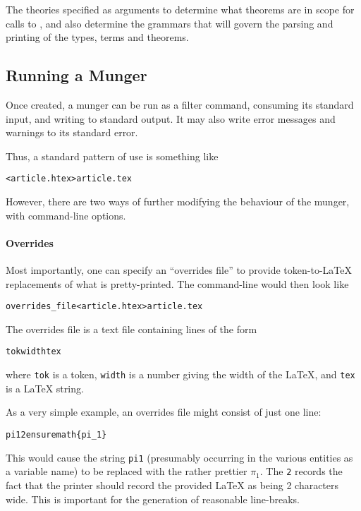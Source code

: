 The theories specified as arguments to \mkmunge{} determine what theorems are in scope for calls to \holthm, and also determine the grammars that will govern the parsing and printing of the \HOL{} types, terms and theorems.


\subsection{Running a Munger}
\label{sec:running-munger}

Once created, a munger can be run as a filter command, consuming its
standard input, and writing to standard output.
%
It may also write error messages and warnings to its standard error.

Thus, a standard pattern of use is something like
\begin{alltt}
   \munge < article.htex > article.tex
\end{alltt}

However, there are two ways of further modifying the behaviour of the
munger, with command-line options.

\paragraph{Overrides}
Most importantly, one can specify an ``overrides file'' to provide
token-to-\LaTeX{} replacements of what is pretty-printed.
%
The command-line would then look like
\begin{alltt}
   \munge overrides_file < article.htex > article.tex
\end{alltt}
The overrides file is a text file containing lines of the form
\begin{alltt}
   tok width tex
\end{alltt}
where \texttt{tok} is a \HOL{} token, \texttt{width} is a number
giving the width of the \LaTeX{}, and \texttt{tex} is a \LaTeX{}
string.

As a very simple example, an overrides file might consist of just one
line:
\begin{alltt}
   pi1 2 \bs{}ensuremath\{\bs{}pi_1\}
\end{alltt}
This would cause the string \texttt{pi1} (presumably occurring in the
various \HOL{} entities as a variable name) to be replaced with the
rather prettier $\pi_1$.
%
The \texttt{2} records the fact that the
printer should record the provided \LaTeX{} as being 2 characters
wide.
%
This is important for the generation of reasonable line-breaks.

